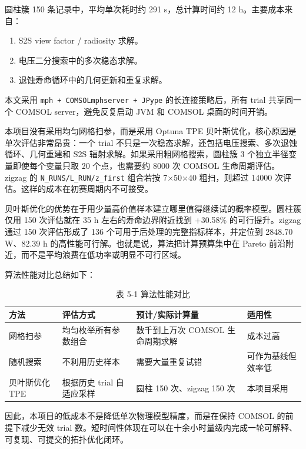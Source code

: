 \documentclass[
  a4paper,
]{ctexart}
\providecommand{\tightlist}{%
  \setlength{\itemsep}{0pt}\setlength{\parskip}{0pt}}
\begin{document}
圆柱簇 150 条记录中，平均单次耗时约 291 s，总计算时间约 12
h。主要成本来自：

\begin{enumerate}
\def\labelenumi{\arabic{enumi}.}
\tightlist
\item
  S2S view factor / radiosity 求解。
\item
  电压二分搜索中的多次稳态求解。
\item
  退蚀寿命循环中的几何更新和重复求解。
\end{enumerate}

本文采用 \texttt{mph\ +\ COMSOLmphserver\ +\ JPype}
的长连接策略后，所有 trial 共享同一个 COMSOL server，避免反复启动 JVM 和
COMSOL 桌面的时间开销。

本项目没有采用均匀网格扫参，而是采用 Optuna TPE
贝叶斯优化，核心原因是单次评估非常昂贵：一个 trial
不只是一次稳态求解，还包括电压搜索、多次退蚀循环、几何重建和 S2S
辐射求解。如果采用粗网格搜索，圆柱簇 3 个独立半径变量即使每个变量只取 20
个点，也需要约 8000 次 COMSOL 生命周期评估。zigzag 的
\texttt{N\_RUNS/L\_RUN/z\_first} 组合若按 7×50×40 粗扫，则超过 14000
次评估。这样的成本在初赛周期内不可接受。

贝叶斯优化的优势在于用少量高价值样本建立哪里值得继续试的概率模型。圆柱簇仅用
150 次评估就在 35 h 左右的寿命边界附近找到 +30.58\% 的可行提升。zigzag
通过 150 次评估形成了 136 个可用于后处理的完整指标样本，并定位到 2848.70 W、82.39 h
的高性能可行解。也就是说，算法把计算预算集中在 Pareto
前沿附近，而不是平均浪费在低功率或明显不可行区域。

算法性能对比总结如下：


\begin{table}[H]
\centering
\caption*{表 5-1 算法性能对比}
\small
\begin{tabularx}{\textwidth}{p{} Y p{0.28\textwidth} Y}
\toprule
方法 & 评估方式 & 预计/实际计算量 & 适用性 \\
\midrule
网格扫参 & 均匀枚举所有参数组合 & 数千到上万次 COMSOL 生命周期求解 & 成本过高 \\
随机搜索 & 不利用历史样本 & 需要大量重复试错 & 可作为基线但效率低 \\
贝叶斯优化 TPE & 根据历史 trial 自适应采样 & 圆柱 150 次、zigzag 150 次 & 本项目采用 \\
\bottomrule
\end{tabularx}
\end{table}


因此，本项目的低成本不是降低单次物理模型精度，而是在保持 COMSOL
的前提下减少无效 trial
数。短时间性体现在可以在十余小时量级内完成一轮可解释、可复现、可提交的拓扑优化闭环。
\end{document}
